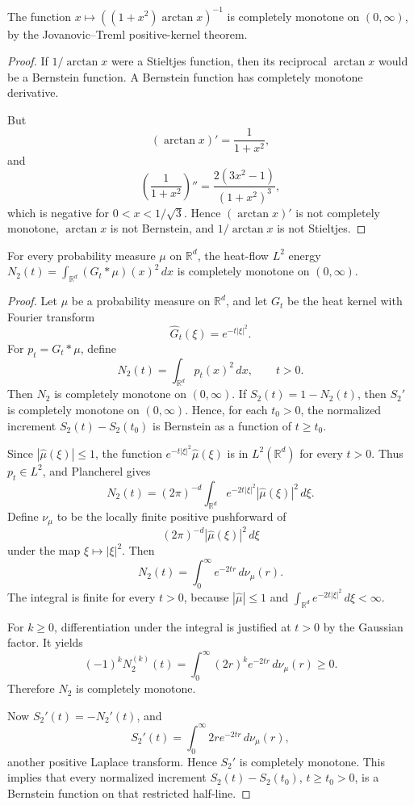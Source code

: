 \begin{proposition}
\label{res:jovanovic-treml-arctan-logderivative-cm}
The function \(x\mapsto ((1+x^2)\arctan x)^{-1}\) is completely monotone on \((0,\infty)\), by the Jovanovic--Treml positive-kernel theorem.
\end{proposition}
\begin{proof}
If \(1/\arctan x\) were a Stieltjes function, then its reciprocal \(\arctan x\) would be a Bernstein function. A Bernstein function has completely monotone derivative.

But
\[
(\arctan x)'=\frac1{1+x^2},
\]
and
\[
\left(\frac1{1+x^2}\right)''
=\frac{2(3x^2-1)}{(1+x^2)^3},
\]
which is negative for \(0<x<1/\sqrt3\). Hence \((\arctan x)'\) is not completely monotone, \(\arctan x\) is not Bernstein, and \(1/\arctan x\) is not Stieltjes.
\end{proof}

\begin{proposition}
\label{res:heat-flow-l2-energy-completely-monotone}
For every probability measure \(\mu\) on \(\mathbb R^d\), the heat-flow \(L^2\) energy \(N_2(t)=\int_{\mathbb R^d}(G_t*\mu)(x)^2\,dx\) is completely monotone on \((0,\infty)\).
\end{proposition}
\begin{proof}
Let \(\mu\) be a probability measure on \(\mathbb R^d\), and let \(G_t\) be the heat kernel with Fourier transform
\[
\widehat G_t(\xi)=e^{-t|\xi|^2}.
\]
For \(p_t=G_t*\mu\), define
\[
N_2(t)=\int_{\mathbb R^d}p_t(x)^2\,dx,\qquad t>0.
\]
Then \(N_2\) is completely monotone on \((0,\infty)\). If \(S_2(t)=1-N_2(t)\), then \(S_2'\) is completely monotone on \((0,\infty)\). Hence, for each \(t_0>0\), the normalized increment \(S_2(t)-S_2(t_0)\) is Bernstein as a function of \(t\ge t_0\).

Since \(|\widehat\mu(\xi)|\le1\), the function \(e^{-t|\xi|^2}\widehat\mu(\xi)\) is in \(L^2(\mathbb R^d)\) for every \(t>0\). Thus \(p_t\in L^2\), and Plancherel gives
\[
N_2(t)
=(2\pi)^{-d}\int_{\mathbb R^d}e^{-2t|\xi|^2}|\widehat\mu(\xi)|^2\,d\xi.
\]
Define \(\nu_\mu\) to be the locally finite positive pushforward of
\[
(2\pi)^{-d}|\widehat\mu(\xi)|^2\,d\xi
\]
under the map \(\xi\mapsto|\xi|^2\). Then
\[
N_2(t)=\int_0^\infty e^{-2tr}\,d\nu_\mu(r).
\]
The integral is finite for every \(t>0\), because \(|\widehat\mu|\le1\) and \(\int_{\mathbb R^d}e^{-2t|\xi|^2}\,d\xi<\infty\).

For \(k\ge0\), differentiation under the integral is justified at \(t>0\) by the Gaussian factor. It yields
\[
(-1)^kN_2^{(k)}(t)
=\int_0^\infty (2r)^k e^{-2tr}\,d\nu_\mu(r)\ge0.
\]
Therefore \(N_2\) is completely monotone.

Now \(S_2'(t)=-N_2'(t)\), and
\[
S_2'(t)=\int_0^\infty 2r e^{-2tr}\,d\nu_\mu(r),
\]
another positive Laplace transform. Hence \(S_2'\) is completely monotone. This implies that every normalized increment \(S_2(t)-S_2(t_0)\), \(t\ge t_0>0\), is a Bernstein function on that restricted half-line.
\end{proof}

